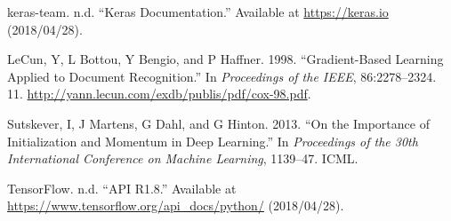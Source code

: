 \documentclass[conference,final,]{IEEEtran}
\begin{document}
\hypertarget{ref-keras}{}
keras-team. n.d. ``Keras Documentation.'' Available at
\url{https://keras.io} (2018/04/28).

\hypertarget{ref-lecun1998}{}
LeCun, Y, L Bottou, Y Bengio, and P Haffner. 1998. ``Gradient-Based
Learning Applied to Document Recognition.'' In \emph{Proceedings of the
IEEE}, 86:2278--2324. 11.
\url{http://yann.lecun.com/exdb/publis/pdf/cox-98.pdf}.

\hypertarget{ref-sgd2013}{}
Sutskever, I, J Martens, G Dahl, and G Hinton. 2013. ``On the Importance
of Initialization and Momentum in Deep Learning.'' In \emph{Proceedings
of the 30th International Conference on Machine Learning}, 1139--47.
ICML.

\hypertarget{ref-tfr18}{}
TensorFlow. n.d. ``API R1.8.'' Available at
\url{https://www.tensorflow.org/api_docs/python/} (2018/04/28).
\end{document}
